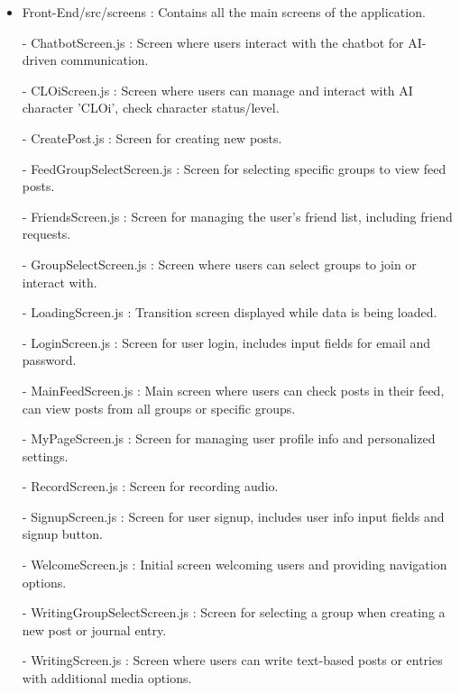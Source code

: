 \begin{itemize}
                    
                    \item Front-End/src/screens : Contains all the main screens of the application.
                        \item[-] ChatbotScreen.js : Screen where users interact with the chatbot for AI-driven communication.
                        \item[-] CLOiScreen.js : Screen where users can manage and interact with AI character 'CLOi', check character status/level.
                        \item[-] CreatePost.js : Screen for creating new posts.
                        \item[-] FeedGroupSelectScreen.js : Screen for selecting specific groups to view feed posts.
                        \item[-] FriendsScreen.js : Screen for managing the user's friend list, including friend requests.
                        \item[-] GroupSelectScreen.js : Screen where users can select groups to join or interact with.
                        \item[-] LoadingScreen.js : Transition screen displayed while data is being loaded.
                        \item[-] LoginScreen.js : Screen for user login, includes input fields for email and password.
                        \item[-] MainFeedScreen.js : Main screen where users can check posts in their feed, can view posts from all groups or specific groups.
                        \item[-] MyPageScreen.js : Screen for managing user profile info and personalized settings.
                        \item[-] RecordScreen.js : Screen for recording audio.
                        \item[-] SignupScreen.js : Screen for user signup, includes user info input fields and signup button.
                        \item[-] WelcomeScreen.js : Initial screen welcoming users and providing navigation options.
                        \item[-] WritingGroupSelectScreen.js : Screen for selecting a group when creating a new post or journal entry.
                        \item[-] WritingScreen.js : Screen where users can write text-based posts or entries with additional media options.
                    \vspace{3mm}
                    

\end{itemize}
